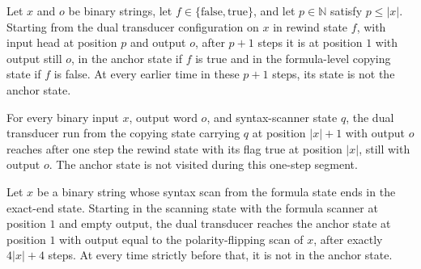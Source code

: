 \begin{lemma}
\label{Complexity.tautDual_rewind}
\leanok
{}
Let $x$ and $o$ be binary strings, let $f\in\{\mathrm{false},\mathrm{true}\}$, and let
$p\in\mathbb{N}$ satisfy $p\le |x|$. Starting from the dual transducer configuration on
$x$ in rewind state $f$, with input head at position $p$ and output $o$, after $p+1$
steps it is at position $1$ with output still $o$, in the anchor state if $f$ is true
and in the formula-level copying state if $f$ is false. At every earlier time in these
$p+1$ steps, its state is not the anchor state.
\end{lemma}

\begin{lemma}
\label{Complexity.tautDual_copy_end}
\leanok
{}
For every binary input $x$, output word $o$, and syntax-scanner state $q$, the dual
transducer run from the copying state carrying $q$ at position $|x|+1$ with output $o$
reaches after one step the rewind state with its flag true at position $|x|$, still with
output $o$. The anchor state is not visited during this one-step segment.
\end{lemma}

\begin{lemma}
\label{Complexity.tautDual_valid}
\leanok
{}
Let $x$ be a binary string whose syntax scan from the formula state ends in the
exact-end state. Starting in the scanning state with the formula scanner at position $1$
and empty output, the dual transducer reaches the anchor state at position $1$ with
output equal to the polarity-flipping scan of $x$, after exactly $4|x|+4$ steps. At
every time strictly before that, it is not in the anchor state.
\end{lemma}

